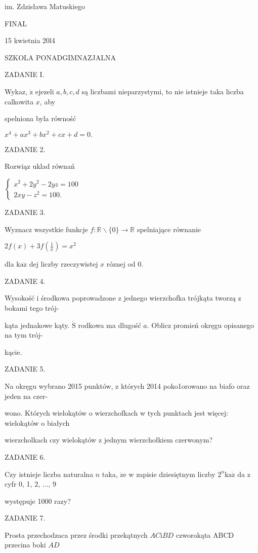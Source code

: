 \documentclass[a4paper,12pt]{article}
\begin{document}
im. Zdzisława Matuskiego

FINAL

15 kwietnia 20l4

SZKOLA PONADGIMNAZJALNA

ZADANIE I.

Wykaz, $\dot{\mathrm{z}}$ ejezeli $a, b, c, d$ są liczbami nieparzystymi, to nie istnieje taka liczba calkowita $x$, aby

spelniona byla równość

$x^{4}+ax^{3}+bx^{2}+cx+d=0.$

ZADANIE 2.

Rozwiąz uklad równań

$\left\{\begin{array}{l}
x^{2}+2y^{2}-2yz=100\\
2xy-z^{2}=100.
\end{array}\right.$

ZADANIE 3.

Wyznacz wszystkie funkcje $f:\mathbb{R}\backslash \{0\}\rightarrow \mathbb{R}$ spelniające równanie

$2f(x)+3f(\displaystyle \frac{1}{x})=x^{2}$

dla $\mathrm{k}\mathrm{a}\dot{\mathrm{z}}$ dej liczby rzeczywistej $x$ róznej od 0.

ZADANIE 4.

Wysokość i środkowa poprowadzone z jednego wierzchofka trójkąta tworzą z bokami tego trój-

kąta jednakowe kąty. $\acute{\mathrm{S}}$ rodkowa ma dlugość $a$. Oblicz promień okręgu opisanego na tym trój-

kącie.

ZADANIE 5.

Na okręgu wybrano 2015 punktów, z których 2014 poko1orowano na biafo oraz jeden na czer-

wono. Których wielokątów o wierzchofkach w tych punktach jest więcej: wielokątów o białych

wierzcholkach czy wielokątów z jednym wierzchołkiem czerwonym?

ZADANIE 6.

Czy istnieje liczba naturalna $n$ taka, $\dot{\mathrm{z}}\mathrm{e}$ w zapisie dziesiętnym liczby $2^{n}\mathrm{k}\mathrm{a}\dot{\mathrm{z}}$ da z cyfr 0, 1, 2, $\ldots$, 9

występuje 1000 razy?

ZADANIE 7.

Prosta przechodzaca przez środki przekątnych $AC\mathrm{i}BD$ czworokąta ABCD przecina boki $AD$
\end{document}
